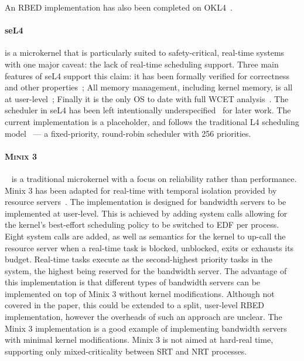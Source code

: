An \gls{RBED} implementation has also been completed on OKL4~\citep{Petters_LHE_09}.

\paragraph{seL4} is a microkernel that is particularly suited to safety-critical, real-time systems with one major caveat: the lack of real-time scheduling support.
Three main features of seL4 support this claim: it has been formally verified for correctness~\citep{Klein_EHACDEEKNSTW_09} and other properties~\citep{Sewell_WGMAK_11}; All memory management, including kernel memory, is all at user-level~\citep{Elkaduwe_Derrin_06}; Finally it is the only \gls{OS} to date with full \gls{WCET} analysis~\citep{Blackham_SCRH_11}.
The scheduler in seL4 has been left intentionally underspecified~\citep{Petters_EH_12} for later work.
The current implementation is a placeholder, and follows the traditional L4 scheduling model~\citep{Ruocco_06} --- a fixed-priority, round-robin scheduler with 256 priorities.

\paragraph{\textsc{Minix 3}}~\citep{Herder_BGHT_06} is a traditional microkernel with a focus on reliability rather than performance.
{\sc Minix 3} has been adapted for real-time with temporal isolation provided by resource servers~\citep{Mancina_LFHGT_2009}.
 The implementation is designed for bandwidth servers to be implemented at user-level. 
This is achieved by adding system calls allowing for the kernel's best-effort scheduling policy to be switched to \gls{EDF} per process. 
Eight system calls are added, as well as semantics for the kernel to up-call the resource server when a real-time task is blocked, unblocked, exits or exhausts its budget.
Real-time tasks execute as the second-highest priority tasks in the system, the highest being reserved for the bandwidth server. 
The advantage of this implementation is that different types of bandwidth servers can be implemented on top of {\sc Minix 3} without kernel modifications.
 Although not covered in the paper, this could be extended to a split, user-level \gls{RBED} implementation, however the overheads of such an approach are unclear. 
The {\sc Minix 3} implementation is a good example of implementing bandwidth servers with minimal kernel modifications.
 {\sc Minix 3} is not aimed at hard-real time, supporting only mixed-criticality between \gls{SRT} and \gls{NRT} processes.


